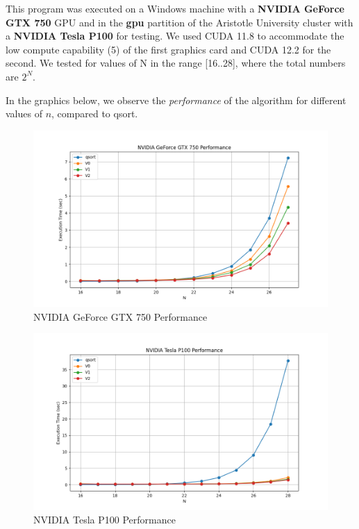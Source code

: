 \documentclass[12pt]{report}
\begin{document}
This program was executed on a Windows machine with a \textbf{NVIDIA GeForce GTX 750} GPU and in the \textbf{gpu} partition of the Aristotle University cluster with a \textbf{NVIDIA Tesla P100} for testing. We used CUDA 11.8 to accommodate the low compute capability (5) of the first graphics card and CUDA 12.2 for the second. We tested for values of N in the range [16..28], where the total numbers are $2^N$. \newpage

In the graphics below, we observe the \textit{performance} of the algorithm for different values of $n$, compared to qsort. 

\begin{figure}[H]
    \centering
    \includegraphics[width=1\linewidth]{assets/GTX750.png}
    \caption{NVIDIA GeForce GTX 750 Performance}
    \label{fig:enter-label}
\end{figure}

\begin{figure}[H]
    \centering
    \includegraphics[width=1\linewidth]{assets/TESLAP100.png}
    \caption{NVIDIA Tesla P100 Performance}
    \label{fig:enter-label}
\end{figure}
\end{document}
